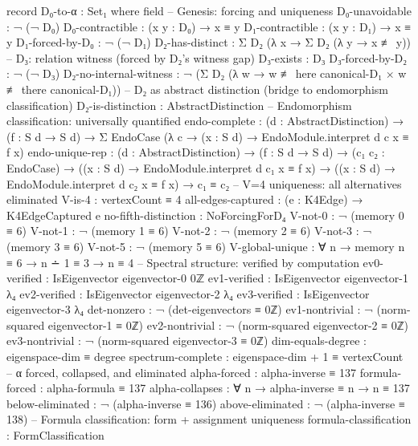 \documentclass[11pt,a4paper]{article}
\begin{document}
\begin{code}
record D₀-to-α : Set₁ where
  field
    -- Genesis: forcing and uniqueness
    D₀-unavoidable        : ¬ (¬ D₀)
    D₀-contractible       : (x y : D₀) → x ≡ y
    D₁-contractible       : (x y : D₁) → x ≡ y
    D₁-forced-by-D₀      : ¬ (¬ D₁)
    D₂-has-distinct       : Σ D₂ (λ x → Σ D₂ (λ y → x ≢ y))
    -- D₃: relation witness (forced by D₂'s witness gap)
    D₃-exists             : D₃
    D₃-forced-by-D₂       : ¬ (¬ D₃)
    D₂-no-internal-witness : ¬ (Σ D₂ (λ w → w ≢ here canonical-D₁ × w ≢ there canonical-D₁))
    -- D₂ as abstract distinction (bridge to endomorphism classification)
    D₂-is-distinction     : AbstractDistinction
    -- Endomorphism classification: universally quantified
    endo-complete          : (d : AbstractDistinction) → (f : S d → S d) →
                             Σ EndoCase (λ c → (x : S d) →
                               EndoModule.interpret d c x ≡ f x)
    endo-unique-rep        : (d : AbstractDistinction) → (f : S d → S d) →
                             (c₁ c₂ : EndoCase) →
                             ((x : S d) → EndoModule.interpret d c₁ x ≡ f x) →
                             ((x : S d) → EndoModule.interpret d c₂ x ≡ f x) →
                             c₁ ≡ c₂
    -- V=4 uniqueness: all alternatives eliminated
    V-is-4                : vertexCount ≡ 4
    all-edges-captured     : (e : K4Edge) → K4EdgeCaptured e
    no-fifth-distinction   : NoForcingForD₄
    V-not-0               : ¬ (memory 0 ≡ 6)
    V-not-1               : ¬ (memory 1 ≡ 6)
    V-not-2               : ¬ (memory 2 ≡ 6)
    V-not-3               : ¬ (memory 3 ≡ 6)
    V-not-5               : ¬ (memory 5 ≡ 6)
    V-global-unique       : ∀ n → memory n ≡ 6 → n ∸ 1 ≡ 3 → n ≡ 4
    -- Spectral structure: verified by computation
    ev0-verified          : IsEigenvector eigenvector-0 0ℤ
    ev1-verified          : IsEigenvector eigenvector-1 λ₄
    ev2-verified          : IsEigenvector eigenvector-2 λ₄
    ev3-verified          : IsEigenvector eigenvector-3 λ₄
    det-nonzero           : ¬ (det-eigenvectors ≡ 0ℤ)
    ev1-nontrivial        : ¬ (norm-squared eigenvector-1 ≡ 0ℤ)
    ev2-nontrivial        : ¬ (norm-squared eigenvector-2 ≡ 0ℤ)
    ev3-nontrivial        : ¬ (norm-squared eigenvector-3 ≡ 0ℤ)
    dim-equals-degree     : eigenspace-dim ≡ degree
    spectrum-complete     : eigenspace-dim + 1 ≡ vertexCount
    -- α forced, collapsed, and eliminated
    alpha-forced          : alpha-inverse ≡ 137
    formula-forced        : alpha-formula ≡ 137
    alpha-collapses       : ∀ n → alpha-inverse ≡ n → n ≡ 137
    below-eliminated      : ¬ (alpha-inverse ≡ 136)
    above-eliminated      : ¬ (alpha-inverse ≡ 138)
    -- Formula classification: form + assignment uniqueness
    formula-classification : FormClassification


\end{code}
\end{document}
